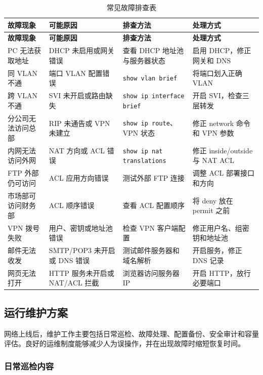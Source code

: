 \documentclass[12pt,a4paper]{ctexart}
\begin{document}
\begin{longtable}{|p{3cm}|p{4cm}|p{4cm}|p{3.5cm}|}
\caption{常见故障排查表}
\label{tab:troubleshooting}\\
\hline
\textbf{故障现象} & \textbf{可能原因} & \textbf{排查方法} & \textbf{处理方式} \\ \hline
\endfirsthead
\hline
\textbf{故障现象} & \textbf{可能原因} & \textbf{排查方法} & \textbf{处理方式} \\ \hline
\endhead
PC 无法获取地址 & DHCP 未启用或网关错误 & 查看 DHCP 地址池与服务器状态 & 启用 DHCP，修正网关和 DNS \\ \hline
同 VLAN 不通 & 端口 VLAN 配置错误 & \texttt{show vlan brief} & 将端口划入正确 VLAN \\ \hline
跨 VLAN 不通 & SVI 未开启或路由缺失 & \texttt{show ip interface brief} & 开启 SVI，检查三层转发 \\ \hline
分公司无法访问总部 & RIP 未通告或 VPN 未建立 & \texttt{show ip route}、VPN 状态 & 修正 network 命令和 VPN 参数 \\ \hline
内网无法访问外网 & NAT 方向或 ACL 错误 & \texttt{show ip nat translations} & 修正 inside/outside 与 NAT ACL \\ \hline
FTP 外部仍可访问 & ACL 应用方向错误 & 测试外部 FTP 连接 & 调整 ACL 部署接口和方向 \\ \hline
市场部可访问财务部 & ACL 顺序错误 & 查看 ACL 配置顺序 & 将 deny 放在 permit 之前 \\ \hline
VPN 拨号失败 & 用户、密钥或地址池错误 & 检查 VPN 客户端配置 & 修正用户名、组密钥和地址池 \\ \hline
邮件无法收发 & SMTP/POP3 未开启或 DNS 错误 & 测试邮件服务器和域名解析 & 开启服务，修正 DNS 记录 \\ \hline
网页无法打开 & HTTP 服务未开启或 NAT/ACL 拦截 & 浏览器访问服务器 IP & 开启 HTTP，放行必要端口 \\ \hline
\end{longtable}

\subsection{运行维护方案}

网络上线后，维护工作主要包括日常巡检、故障处理、配置备份、安全审计和容量评估。良好的运维制度能够减少人为误操作，并在出现故障时缩短恢复时间。

\subsubsection{日常巡检内容}
\end{document}
